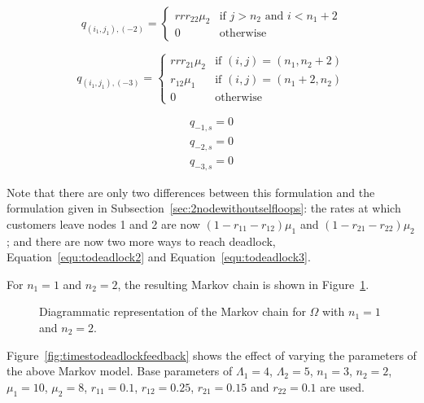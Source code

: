 \documentclass{article}
\numberwithin{equation}{section}
\begin{document}
\begin{equation}\label{equ:todeadlock3}
  q_{(i_1, j_1), (-2)} = \left\{
  \begin{matrix}{rr}
    r_{22}\mu_2 & \text{if } j > n_2 \text{ and } i < n_1 + 2 \\
    0 & \text{otherwise}
  \end{matrix}
  \right.
\end{equation}

\begin{equation}
  q_{(i_1, j_1), (-3)} = \left\{
  \begin{matrix}{rr}
    r_{21}\mu_2 & \text{if } (i, j) = (n_1, n_2 + 2) \\
    r_{12}\mu_1 & \text{if } (i, j) = (n_1 + 2, n_2) \\
    0 & \text{otherwise}
  \end{matrix}
  \right.
\end{equation}

\begin{align}
  q_{-1, s} = 0 \\
  q_{-2, s} = 0 \\
  q_{-3, s} = 0
\end{align}

Note that there are only two differences between this formulation and the formulation given in Subsection~\ref{sec:2nodewithoutselfloops}: the rates at which customers leave nodes 1 and 2 are now $(1-r_{11}-r_{12})\mu_1$ and $(1-r_{21}-r_{22})\mu_2$; and there are now two more ways to reach deadlock, Equation~\ref{equ:todeadlock2} and Equation~\ref{equ:todeadlock3}.

For $n_1 = 1$ and $n_2 = 2$, the resulting Markov chain is shown in Figure~\ref{fig:2nodeMCfeedback}.

\begin{figure}[!htbp]
    \begin{center}
    
    \end{center}
    \caption{Diagrammatic representation of the Markov chain for $\Omega$ with $n_1=1$ and $n_2=2$.}
    \label{fig:2nodeMCfeedback}
\end{figure}

Figure~\ref{fig:timestodeadlockfeedback} shows the effect of varying the parameters of the above Markov model.
Base parameters of $\Lambda_1 = 4$, $\Lambda_2 = 5$, $n_1 = 3$, $n_2 = 2$, $\mu_1 = 10$, $\mu_2 = 8$, $r_{11} = 0.1$, $r_{12} = 0.25$, $r_{21} = 0.15$ and $r_{22} = 0.1$ are used.
\end{document}
